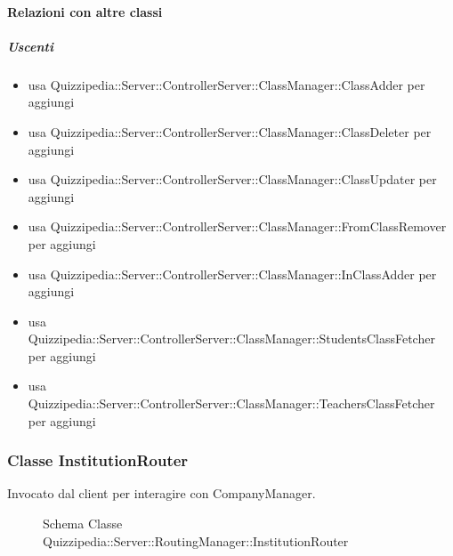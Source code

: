 \paragraph{Relazioni con altre classi}
\subparagraph{Uscenti}
\begin{itemize}
\item usa Quizzipedia::Server::ControllerServer::ClassManager::ClassAdder per aggiungi
\item usa Quizzipedia::Server::ControllerServer::ClassManager::ClassDeleter per aggiungi
\item usa Quizzipedia::Server::ControllerServer::ClassManager::ClassUpdater per aggiungi
\item usa Quizzipedia::Server::ControllerServer::ClassManager::FromClassRemover per aggiungi
\item usa Quizzipedia::Server::ControllerServer::ClassManager::InClassAdder per aggiungi
\item usa Quizzipedia::Server::ControllerServer::ClassManager::StudentsClassFetcher per aggiungi
\item usa Quizzipedia::Server::ControllerServer::ClassManager::TeachersClassFetcher per aggiungi
\end{itemize}
\subsubsection{Classe InstitutionRouter}
Invocato dal client per interagire con CompanyManager.
\begin{figure}[H]
\centering
\noindent{}
\caption[Schema Classe InstitutionRouter]{Schema Classe Quizzipedia::Server::RoutingManager::InstitutionRouter}
\end{figure}
